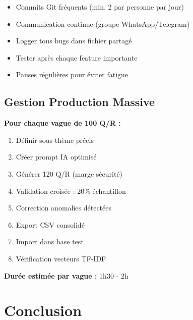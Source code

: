 \documentclass[11pt,a4paper]{article}
\begin{document}
\begin{itemize}
    \item[\faIcon{sync}] Commits Git fréquents (min. 2 par personne par jour)
    \item[\faIcon{comments}] Communication continue (groupe WhatsApp/Telegram)
    \item[\faIcon{bug}] Logger tous bugs dans fichier partagé
    \item[\faIcon{flask}] Tester après chaque feature importante
    \item[\faIcon{coffee}] Pauses régulières pour éviter fatigue
\end{itemize}

\subsection{Gestion Production Massive}

\begin{astuce}
\textbf{Pour chaque vague de 100 Q/R :}

\begin{enumerate}
    \item Définir sous-thème précis
    \item Créer prompt IA optimisé
    \item Générer 120 Q/R (marge sécurité)
    \item Validation croisée : 20\% échantillon
    \item Correction anomalies détectées
    \item Export CSV consolidé
    \item Import dans base test
    \item Vérification vecteurs TF-IDF
\end{enumerate}

\textbf{Durée estimée par vague :} 1h30 - 2h
\end{astuce}

\clearpage


\section*{Conclusion}

\vspace{1cm}
\end{document}
